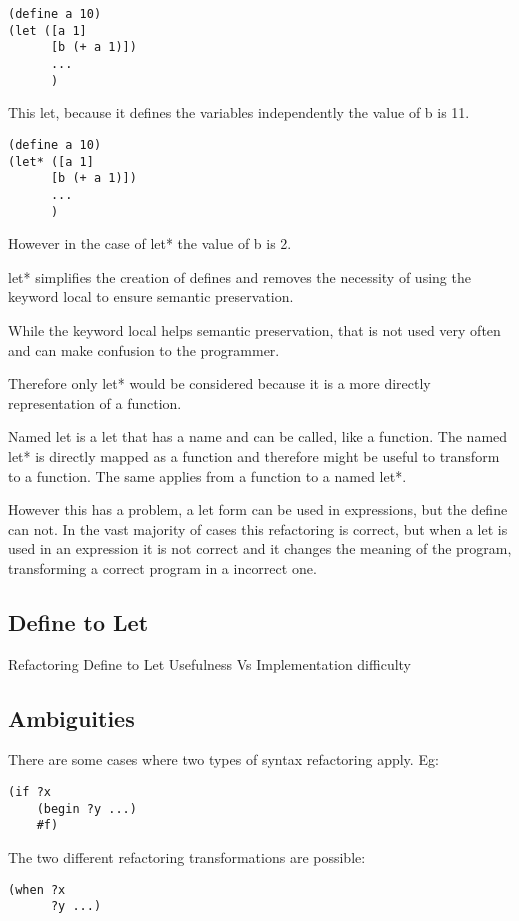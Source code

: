 \begin{lstlisting}[caption="Example"]
(define a 10)
(let ([a 1]
      [b (+ a 1)])
      ...
      )
\end{lstlisting}
This let, because it defines the variables independently the value of b is 11.

\begin{lstlisting}[caption="Example"]
(define a 10)
(let* ([a 1]
      [b (+ a 1)])
      ...
      )
\end{lstlisting}
However in the case of let* the value of b is 2.

let* simplifies the creation of defines and removes the necessity of using the
keyword local to ensure semantic preservation.

While the keyword local helps semantic preservation, that is not used very often
and can make confusion to the programmer.

Therefore only let* would be considered because it is a more directly
representation of a function.

Named let is a let that has a name and can be called, like a function.
The named let* is directly mapped as a function and therefore might be useful to transform to a function.
The same applies from a function to a named let*.

However this has a problem, a let form can be used in expressions, but the define can not.
In the vast majority of cases this refactoring is correct, but when a let is used in an expression
it is not correct and it changes the meaning of the program, transforming a correct
program in a incorrect one.


\subsection{Define to Let}
Refactoring Define to Let Usefulness Vs Implementation difficulty

\subsection{Ambiguities}
There are some cases where two types of syntax refactoring apply.
Eg:
\begin{lstlisting}[caption="Example"]
(if ?x
    (begin ?y ...)
    #f)
\end{lstlisting}
The two different refactoring transformations are possible:
\begin{lstlisting}[caption="Example"]
(when ?x
      ?y ...)
\end{lstlisting}

